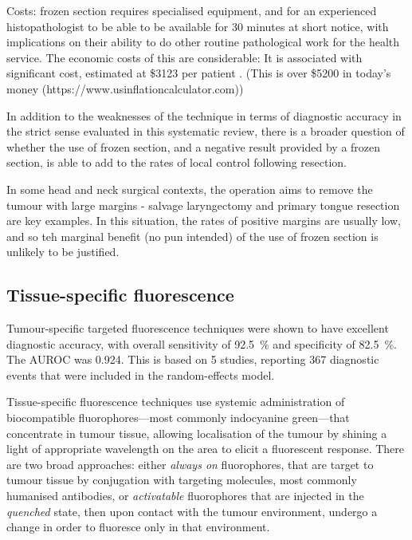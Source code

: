 Costs: frozen section requires specialised equipment, and for an experienced histopathologist to be able to be available for 30 minutes at short notice, with implications on their ability to do other routine pathological work for the health service. 
The economic costs of this are considerable: 
It is associated with significant cost, estimated at \$3123 per patient \cite{dinardoAccuracyUtilityCost2000}. 
(This is over \$5200 in today's money (https://www.usinflationcalculator.com))

In addition to the weaknesses of the technique in terms of diagnostic accuracy in the strict sense evaluated in this systematic review, there is a broader question of whether the use of frozen section, and a negative result provided by a frozen section, is able to add to the rates of local control following resection.

In some head and neck surgical contexts, the operation aims to remove the tumour with large margins - salvage laryngectomy and primary tongue resection are key examples. 
In this situation, the rates of positive margins are usually low, and so teh marginal benefit (no pun intended) of the use of frozen section is unlikely to be justified.





\subsection{Tissue-specific fluorescence}

Tumour-specific targeted fluorescence techniques were shown to have excellent diagnostic accuracy, with overall sensitivity of \SI{92.5}{\percent} and specificity of \SI{82.5}{\percent}. 
The AUROC was 0.924.
This is based on 5 studies, reporting 367 diagnostic events that were included in the random-effects model.

Tissue-specific fluorescence techniques use systemic administration of biocompatible fluorophores---most commonly indocyanine green---that concentrate in tumour tissue, allowing localisation of the tumour  by shining a light of appropriate wavelength on the area to elicit a fluorescent response.
There are two broad approaches: either \emph{always on} fluorophores, that are target to tumour tissue by conjugation with targeting molecules, most commonly humanised antibodies, or \emph{activatable} fluorophores that are injected in the \emph{quenched} state, then upon contact with the tumour environment, undergo a change in order to fluoresce only in that environment.

